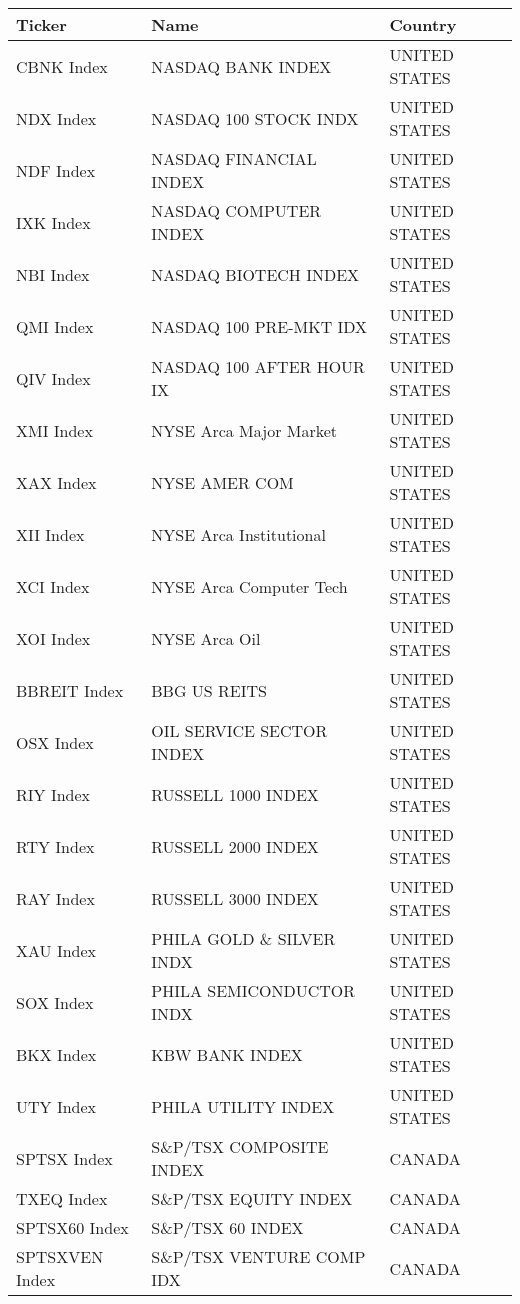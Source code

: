 \begin {table}[H]
\begin{center}
\small
\hspace*{-3cm}
\begin{tabu}{| l l l |} 
\hline
Ticker & Name & Country\\
\hline
CBNK Index & NASDAQ BANK INDEX & UNITED STATES \\ 
NDX Index & NASDAQ 100 STOCK INDX & UNITED STATES \\ 
NDF Index & NASDAQ FINANCIAL INDEX & UNITED STATES \\ 
IXK Index & NASDAQ COMPUTER INDEX & UNITED STATES \\ 
NBI Index & NASDAQ BIOTECH INDEX & UNITED STATES \\ 
QMI Index & NASDAQ 100 PRE-MKT IDX & UNITED STATES \\ 
QIV Index & NASDAQ 100 AFTER HOUR IX & UNITED STATES \\ 
XMI Index & NYSE Arca Major Market & UNITED STATES \\ 
XAX Index & NYSE AMER COM & UNITED STATES \\ 
XII Index & NYSE Arca Institutional & UNITED STATES \\ 
XCI Index & NYSE Arca Computer Tech & UNITED STATES \\ 
XOI Index & NYSE Arca Oil & UNITED STATES \\ 
BBREIT Index & BBG US REITS & UNITED STATES \\ 
OSX Index & OIL SERVICE SECTOR INDEX & UNITED STATES \\ 
RIY Index & RUSSELL 1000 INDEX & UNITED STATES \\ 
RTY Index & RUSSELL 2000 INDEX & UNITED STATES \\ 
RAY Index & RUSSELL 3000 INDEX & UNITED STATES \\ 
XAU Index & PHILA GOLD \& SILVER INDX & UNITED STATES \\ 
SOX Index & PHILA SEMICONDUCTOR INDX & UNITED STATES \\ 
BKX Index & KBW BANK INDEX & UNITED STATES \\ 
UTY Index & PHILA UTILITY INDEX & UNITED STATES \\ 
SPTSX Index & S\&P/TSX COMPOSITE INDEX & CANADA \\ 
TXEQ Index & S\&P/TSX EQUITY INDEX & CANADA \\ 
SPTSX60 Index & S\&P/TSX 60 INDEX & CANADA \\ 
SPTSXVEN Index & S\&P/TSX VENTURE COMP IDX & CANADA \\ 

\end{tabu}
\end{center}
\end{table}
